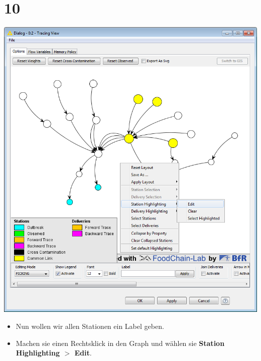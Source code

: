 \documentclass{beamer}
\begin{document}
\section{10}
\begin{frame}
	\begin{center}
  		\includegraphics[height=0.6\textheight]{10.png}
	\end{center}
	\begin{itemize}
		\item Nun wollen wir allen Stationen ein Label geben.
		\item Machen sie einen Rechtsklick in den Graph und wählen sie \textbf{Station Highlighting $>$ Edit}.
	\end{itemize}
\end{frame}
\end{document}
